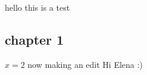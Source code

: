 \documentclass{article}
\begin{document}
hello this is a test
\subsection{chapter 1}
$x=2$
now making an edit
Hi Elena :)
\end{document}
